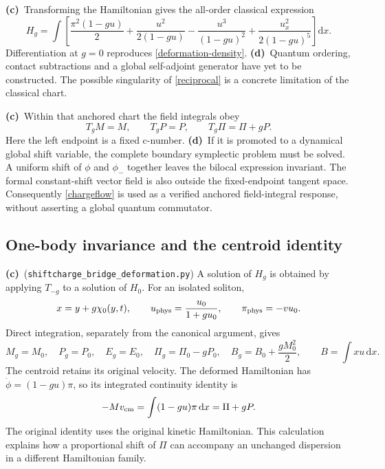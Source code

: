 \documentclass[11pt,a4paper]{article}
\newcommand{\C}{\textbf{(c)}\ }
\newcommand{\D}{\textbf{(d)}\ }
\newcommand{\dd}{\mathrm d}
\newcommand{\file}[1]{\nolinkurl{#1}}
\newcommand{\df}{\file{shiftcharge_bridge_deformation.py}}
\begin{document}
\C Transforming the Hamiltonian gives the all-order classical expression
\begin{equation}
 \boxed{
 H_g=\int\left[
 \frac{\pi^2(1-gu)}2+\frac{u^2}{2(1-gu)}
 -\frac{u^3}{(1-gu)^2}+\frac{u_x^2}{2(1-gu)^5}
 \right]\dd x .}
 \label{hg}
\end{equation}
Differentiation at $g=0$ reproduces \eqref{deformation-density}.
\D Quantum ordering, contact subtractions and a global self-adjoint
generator have yet to be constructed. The possible singularity of
\eqref{reciprocal} is a concrete limitation of the classical chart.

\C Within that anchored chart the field integrals obey
\begin{equation}
 T_gM=M,\qquad T_gP=P,\qquad T_g\Pi=\Pi+gP.
 \label{chargeflow}
\end{equation}
Here the left endpoint is a fixed c-number.
\D If it is promoted to a dynamical global shift variable, the complete
boundary symplectic problem must be solved. A uniform shift of $\phi$ and
$\phi_-$ together leaves the bilocal expression invariant. The formal
constant-shift vector field is also outside the fixed-endpoint tangent
space. Consequently \eqref{chargeflow} is used as a verified anchored
field-integral response, without asserting a global quantum commutator.

\subsection{One-body invariance and the centroid identity}
\C (\df) A solution of $H_g$ is obtained by applying $T_{-g}$ to a
solution of $H_0$. For an isolated soliton,
\begin{equation}
 x=y+g\chi_0(y,t),\qquad
 u_{\rm phys}=\frac{u_0}{1+gu_0},\qquad \pi_{\rm phys}=-v u_0 .
\end{equation}
Direct integration, separately from the canonical argument, gives
\begin{equation}
 M_g=M_0,\quad P_g=P_0,\quad E_g=E_0,\quad
 \Pi_g=\Pi_0-gP_0,\quad B_g=B_0+\frac{gM_0^2}{2},
 \qquad B=\int xu\,\dd x.
 \label{onebody-deform}
\end{equation}
The centroid retains its original velocity. The deformed Hamiltonian has
$\dot\phi=(1-gu)\pi$, so its integrated continuity identity is
\begin{equation}
 -M v_{\rm cm}=\int(1-gu)\pi\,\dd x=\Pi+gP.
 \label{deformed-ward}
\end{equation}
The original identity uses the original kinetic Hamiltonian.
This calculation explains how a proportional shift of $\Pi$ can accompany
an unchanged dispersion in a different Hamiltonian family.
\end{document}
